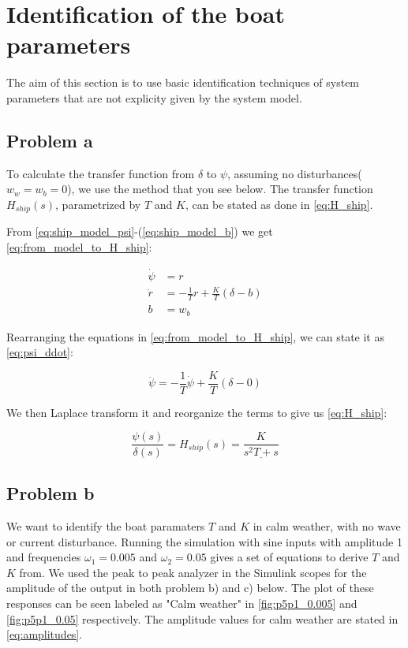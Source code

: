 \section{Identification of the boat parameters}
The aim of this section is to use basic identification techniques of system parameters that are not explicity given by the system model.

\subsection{Problem a}

To calculate the transfer function from $\delta$ to $\psi$, assuming no disturbances($w_w = w_b = 0$), we use the method that you see below. The transfer function $H_{ship}(s)$, parametrized by $T$ and $K$, can be stated as done in \cref{eq:H_ship}.


From \cref{eq:ship_model_psi}-(\ref{eq:ship_model_b}) we get \cref{eq:from_model_to_H_ship}:

\begin{subequations} \label{eq:from_model_to_H_ship}
    \begin{align}
    \dot{\psi} &= r \\ 
    \dot{r} &= - \frac{1}{T} r + \frac{K}{T} (\delta - b) \\
    b &= w_b
    \end{align}
\end{subequations}

Rearranging the equations in \cref{eq:from_model_to_H_ship}, we can state it as \cref{eq:psi_ddot}:

\begin{equation} \label{eq:psi_ddot}
    \ddot{\psi} = - \frac{1}{T} \dot{\psi} + \frac{K}{T} (\delta - 0)
\end{equation}

We then Laplace transform it and reorganize the terms to give us \cref{eq:H_ship}:

\begin{equation} \label{eq:H_ship}
    \frac{\psi(s)}{\delta(s)} = H_{ship}(s) = \underline{\frac{K}{s^2 T + s}}
\end{equation}

\subsection{Problem b}\label{sec:boat_param_calm}

We want to identify the boat paramaters $T$ and $K$ in calm weather, with no wave or current disturbance. Running the simulation with sine inputs with amplitude 1 and frequencies $\omega_1 = 0.005$ and $\omega_2 = 0.05$ gives a set of equations to derive $T$ and $K$ from. We used the peak to peak analyzer in the Simulink scopes for the amplitude of the output in both problem b) and c) below. The plot of these responses can be seen labeled as "Calm weather" in \cref{fig:p5p1_0.005} and \cref{fig:p5p1_0.05} respectively. The amplitude values for calm weather are stated in \cref{eq:amplitudes}.

